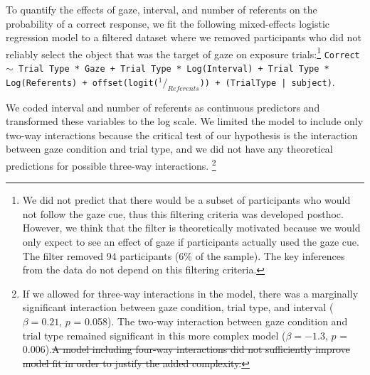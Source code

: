 \documentclass[authoryear, review]{elsarticle}
\providecommand{\DIFdeltex}[1]{{\protect\color{red}\sout{#1}}}                      %
\providecommand{\DIFdelbegin}{} %
\providecommand{\DIFdelend}{} %
\providecommand{\DIFdel}[1]{\texorpdfstring{\DIFdeltex{#1}}{}} %
\begin{document}
To quantify the effects of gaze, interval, and number of referents on
the probability of a correct response, we fit the following
mixed-effects logistic regression model to a filtered dataset where we
removed participants who did not reliably select the object that was the
target of gaze on exposure trials:\footnote{We did not predict that
  there would be a subset of participants who would not follow the gaze
  cue, thus this filtering criteria was developed posthoc. However, we
  think that the filter is theoretically motivated because we would only
  expect to see an effect of gaze if participants actually used the gaze
  cue. The filter removed 94 participants (6\% of the sample). The key
  inferences from the data do not depend on this filtering criteria.}
\texttt{Correct $\sim$ Trial Type * Gaze + Trial Type * Log(Interval) + Trial Type * \\ Log(Referents) + offset(logit($^1/_{Referents}$)) + (TrialType | subject)}.

We coded interval and number of referents as continuous predictors and
transformed these variables to the log scale. We limited the model to
include only two-way interactions because the critical test of our
hypothesis is the interaction between gaze condition and trial type, and
we did not have any theoretical predictions for possible three-way
interactions.
\footnote{If we allowed for three-way interactions in the model, there was a marginally significant interaction between gaze condition, trial type, and interval ($\beta = 0.21$, $p$ = 0.058). The two-way interaction between gaze condition and trial type remained significant in this more complex model ($\beta = -1.3$, $p$ = 0.006).\DIFdelbegin \DIFdel{A model including four-way interactions did not sufficiently improve model fit in order to justify the added complexity.}\DIFdelend }
\end{document}
